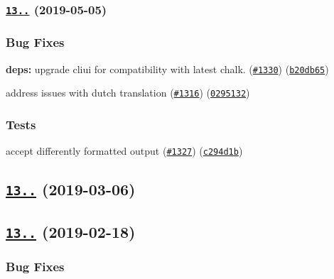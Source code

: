 \subsubsection*{\href{https://github.com/yargs/yargs/compare/v13.2.2...v13.2.3}{\tt 13..} (2019-\/05-\/05)}

\subsubsection*{Bug Fixes}


\begin{DoxyItemize}
\item {\bfseries deps\+:} upgrade cliui for compatibility with latest chalk. (\href{https://github.com/yargs/yargs/issues/1330}{\tt \#1330}) (\href{https://github.com/yargs/yargs/commit/b20db65}{\tt b20db65})
\item address issues with dutch translation (\href{https://github.com/yargs/yargs/issues/1316}{\tt \#1316}) (\href{https://github.com/yargs/yargs/commit/0295132}{\tt 0295132})
\end{DoxyItemize}

\subsubsection*{Tests}


\begin{DoxyItemize}
\item accept differently formatted output (\href{https://github.com/yargs/yargs/issues/1327}{\tt \#1327}) (\href{https://github.com/yargs/yargs/commit/c294d1b}{\tt c294d1b})
\end{DoxyItemize}

\subsection*{\href{https://github.com/yargs/yargs/compare/v13.2.1...v13.2.2}{\tt 13..} (2019-\/03-\/06)}

\subsection*{\href{https://github.com/yargs/yargs/compare/v13.2.0...v13.2.1}{\tt 13..} (2019-\/02-\/18)}

\subsubsection*{Bug Fixes}


